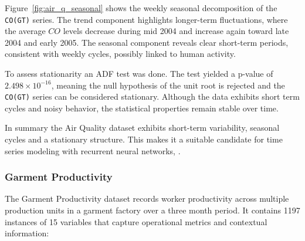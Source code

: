 \documentclass[conference]{IEEEtran}
\begin{document}
Figure~\ref{fig:air_q_seasonal} shows the weekly seasonal decomposition of the \texttt{CO(GT)} series. The trend component highlights longer-term fluctuations, where the average $CO$ levels decrease during mid 2004 and increase again toward late 2004 and early 2005. The seasonal component reveals clear short-term periods, consistent with weekly cycles, possibly linked to human activity.

To assess stationarity an ADF test was done. The test yielded a p-value of $2.498 \times 10^{-16}$, meaning the null hypothesis of the unit root is rejected and the \texttt{CO(GT)} series can be considered stationary. Although the data exhibits short term cycles and noisy behavior, the statistical properties remain stable over time.

In summary the Air Quality dataset exhibits short-term variability, seasonal cycles and a stationary structure. This makes it a suitable candidate for time series modeling with recurrent neural networks, \cite{air_quality}.

\subsubsection{\textbf{Garment Productivity}}

The Garment Productivity dataset records worker productivity across multiple production units in a garment factory over a three month period. It contains 1197 instances of 15 variables that capture operational metrics and contextual information:
\end{document}
